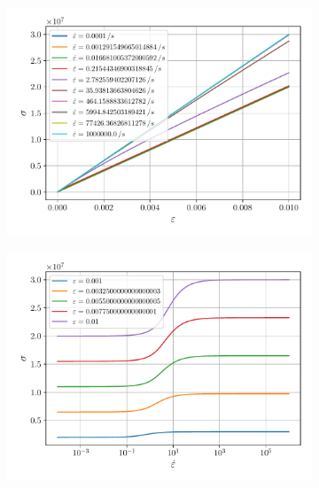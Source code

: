\documentclass[12pt]{article}
\begin{document}
\begin{figure}
	\centering
	\begin{subfigure}{0.48\textwidth}
		\centering 
		\includegraphics[width=\linewidth]{e-stress} 
	\end{subfigure}
	\begin{subfigure}{0.48\textwidth}
		\centering 
		\includegraphics[width=\linewidth]{e-dot-stress} 
	\end{subfigure}


\end{figure}
\end{document}
